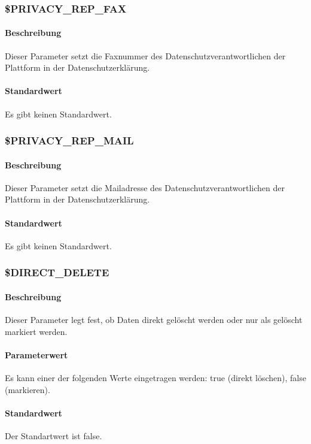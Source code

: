 \subsubsection{\$PRIVACY\_REP\_FAX} \label{config:privacy-rep-fax}
\paragraph{Beschreibung}Dieser Parameter setzt die Faxnummer des Datenschutzverantwortlichen der Plattform in der Datenschutzerklärung.
\paragraph{Standardwert}Es gibt keinen Standardwert.

\subsubsection{\$PRIVACY\_REP\_MAIL} \label{config:privacy-rep-mail}
\paragraph{Beschreibung}Dieser Parameter setzt die Mailadresse des Datenschutzverantwortlichen der Plattform in der Datenschutzerklärung.
\paragraph{Standardwert}Es gibt keinen Standardwert.

\subsubsection{\$DIRECT\_DELETE}\label{config:direct-delete}
\paragraph{Beschreibung}Dieser Parameter legt fest, ob Daten direkt gelöscht werden oder nur als gelöscht markiert werden.
\paragraph{Parameterwert}Es kann einer der folgenden Werte eingetragen werden: {\glqq true\grqq} (direkt löschen), {\glqq false\grqq} (markieren).
\paragraph{Standardwert}Der Standartwert ist {\glqq false\grqq}.

